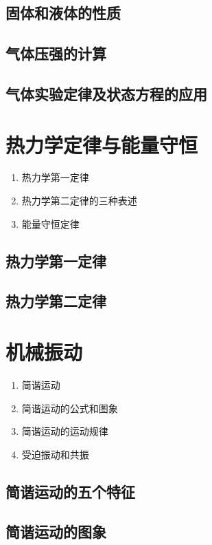 \documentclass[cn,11pt,mac, simple]{elegantbook}
\begin{document}
\clearpage\section{固体和液体的性质}

\clearpage\section{气体压强的计算}

\clearpage\section{气体实验定律及状态方程的应用}

\chapter{热力学定律与能量守恒}
\begin{enumerate}
   \item 热力学第一定律
   \item 热力学第二定律的三种表述
   \item 能量守恒定律
\end{enumerate}

\clearpage\section{热力学第一定律}

\clearpage\section{热力学第二定律}

\chapter{机械振动}
\begin{enumerate}
   \item 简谐运动
   \item 简谐运动的公式和图象
   \item 简谐运动的运动规律
   \item 受迫振动和共振
\end{enumerate}

\clearpage\section{简谐运动的五个特征}

\clearpage\section{简谐运动的图象}
\end{document}

